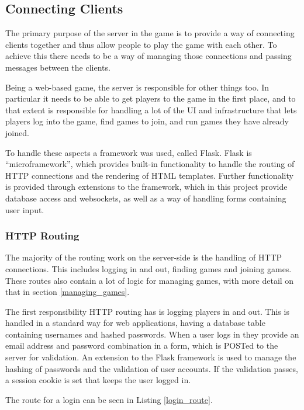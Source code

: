\subsection{Connecting Clients}
The primary purpose of the server in the game is to provide a way of connecting clients together and thus allow people to play the game with each other. To achieve this there needs to be a way of managing those connections and passing messages between the clients.

Being a web-based game, the server is responsible for other things too. In particular it needs to be able to get players to the game in the first place, and to that extent is responsible for handling a lot of the UI and infrastructure that lets players log into the game, find games to join, and run games they have already joined.

To handle these aspects a framework was used, called Flask. Flask is ``microframework'', which provides built-in functionality to handle the routing of HTTP connections and the rendering of HTML templates. Further functionality is provided through extensions to the framework, which in this project provide database access and websockets, as well as a way of handling forms containing user input.

\subsubsection{HTTP Routing}
The majority of the routing work on the server-side is the handling of HTTP connections. This includes logging in and out, finding games and joining games. These routes also contain a lot of logic for managing games, with more detail on that in section \ref{managing_games}.

The first responsibility HTTP routing has is logging players in and out. This is handled in a standard way for web applications, having a database table containing usernames and hashed passwords. When a user logs in they provide an email address and password combination in a form, which is POSTed to the server for validation. An extension to the Flask framework is used to manage the hashing of passwords and the validation of user accounts. If the validation passes, a session cookie is set that keeps the user logged in.

The route for a login can be seen in Listing \ref{login_route}.

